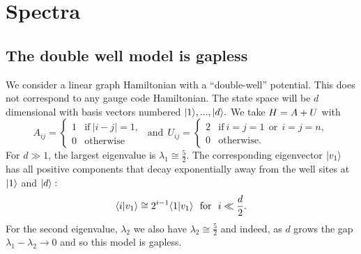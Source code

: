 \documentclass[12pt]{article}
\begin{document}
\section{Spectra}
\label{spectra}

%

\subsection{The double well model is gapless}

We consider a linear graph Hamiltonian
with a ``double-well'' potential.
This does not correspond to any gauge code Hamiltonian.
The state space will be $d$ dimensional with
basis vectors numbered $|{1}\rangle,...,|{d}\rangle.$
We take
$ H = A + U $
with
$$
A_{ij} = \left\{ \begin{array}{ll}
     1 &\mbox{if}\  |i-j|=1,  \\
     0 &\mbox{otherwise}\end{array}\right.
\ \ \mbox{and}\ \ 
U_{ij} =  \left\{ \begin{array}{ll}
     2 &\mbox{if}\  i=j=1 \ \ \mbox{or}\ \  i=j=n, \\
     0 &\mbox{otherwise.}\end{array}\right.
$$
For $d\gg 1$, the largest
eigenvalue is $\lambda_1 \cong \frac{5}{2}$.
The corresponding eigenvector $|{v_1}\rangle$
has all positive components that
decay exponentially away from the well sites
at $|{1}\rangle$ and $|{d}\rangle:$
$$
    \langle{i}|{v_1}\rangle 
    \cong 2^{i-1} \langle{1}|{v_1}\rangle
    \ \ \mbox{for}\ \ i\ll \frac{d}{2}.
$$
For the second eigenvalue, $\lambda_2$
we also have  $\lambda_2 \cong \frac{5}{2}$
and indeed, as $d$ grows
the gap $\lambda_1 - \lambda_2 \rightarrow 0$
and so this model is gapless.
\end{document}
